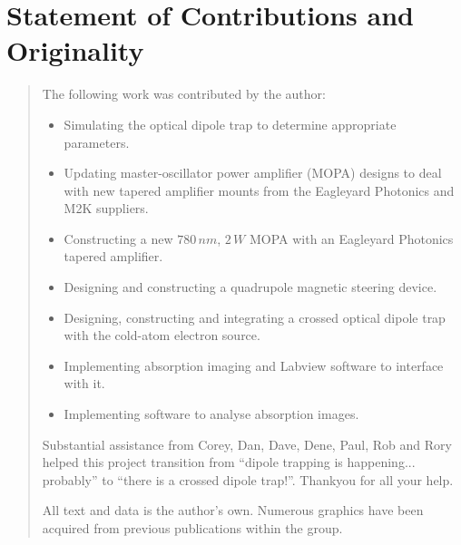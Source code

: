 \chapter*{\centering \LARGE Statement of Contributions and Originality}
\begin{quotation}
\noindent

The following work was contributed by the author:
\begin{itemize}
\item Simulating the optical dipole trap to determine appropriate parameters.
\item Updating master-oscillator power amplifier (MOPA) designs to deal with new tapered amplifier mounts from the Eagleyard Photonics and M2K suppliers.
\item Constructing a new $780\,\unit{nm}$, $2\,\unit{W}$ MOPA with an Eagleyard Photonics tapered amplifier.
\item Designing and constructing a quadrupole magnetic steering device.
\item Designing, constructing and integrating a crossed optical dipole trap with the cold-atom electron source.
\item Implementing absorption imaging and Labview software to interface with it.
\item Implementing software to analyse absorption images.
\end{itemize}

\vspace*{15mm}

Substantial assistance from Corey, Dan, Dave, Dene, Paul, Rob and Rory helped this project transition from ``dipole trapping is happening... probably'' to ``there is a crossed dipole trap!''. Thankyou for all your help.

\vspace*{15mm}

All text and data is the author's own. Numerous graphics have been acquired from previous publications within the group.
\end{quotation}
\clearpage
